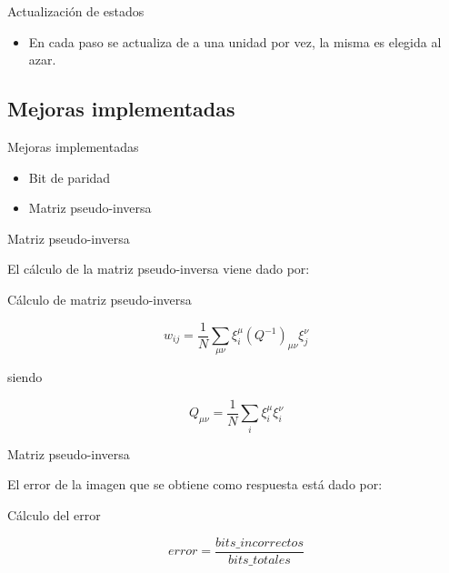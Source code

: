 \documentclass{beamer}
\begin{document}
\begin{frame}{Actualización de estados}

\begin{itemize}
\item En cada paso se actualiza de a una unidad por vez, la misma es elegida al azar.
\end{itemize}

\end{frame}


\subsection{Mejoras implementadas}

\begin{frame}{Mejoras implementadas}

\begin{itemize}
\item \Large Bit de paridad
\item \Large Matriz pseudo-inversa

\end{itemize}
\end{frame}

\begin{frame}{Matriz pseudo-inversa}

\par El cálculo de la matriz pseudo-inversa viene dado por:

\begin{block}{Cálculo de matriz pseudo-inversa}

\[
w_{ij}=\frac{1}{N}\sum_{\mu \nu} \xi_i^{\mu}(Q^{-1})_{\mu \nu}  \xi_j^{\nu}
\]

siendo

\[
Q_{\mu \nu} = \frac{1}{N}\sum_{i}  \xi_i^{\mu}  \xi_i^{\nu}
\]

\end{block}
\end{frame}

\begin{frame}{Matriz pseudo-inversa}

\par El error de la imagen que se obtiene como respuesta está dado por: \\
\vspace{20px}
\begin{block}{Cálculo del error}


\[
error = \frac{bits\_incorrectos}{bits\_totales}
\]


\end{block}
\end{frame}
\end{document}
